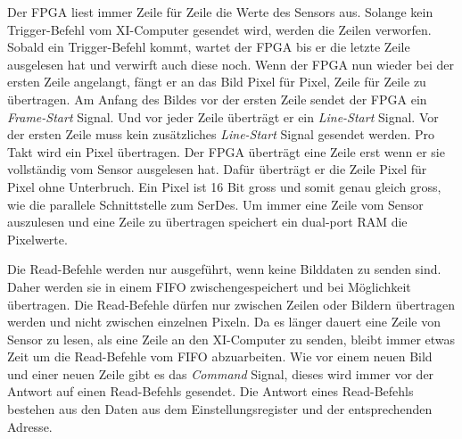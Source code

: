 \documentclass{article}
\begin{document}
Der FPGA liest immer Zeile für Zeile die Werte des Sensors aus. Solange kein Trigger-Befehl vom XI-Computer gesendet wird, werden die Zeilen verworfen. Sobald ein Trigger-Befehl kommt, wartet der FPGA bis er die letzte Zeile ausgelesen hat und verwirft auch diese noch. Wenn der FPGA nun wieder bei der ersten Zeile angelangt, fängt er an das Bild Pixel für Pixel, Zeile für Zeile zu übertragen. Am Anfang des Bildes vor der ersten Zeile sendet der FPGA ein \textit{Frame-Start} Signal. Und vor jeder Zeile überträgt er ein \textit{Line-Start} Signal. Vor der ersten Zeile muss kein zusätzliches \textit{Line-Start} Signal gesendet werden. Pro Takt wird ein Pixel übertragen. Der FPGA überträgt eine Zeile erst wenn er sie vollständig vom Sensor ausgelesen hat. Dafür überträgt er die Zeile Pixel für Pixel ohne Unterbruch. Ein Pixel ist 16 Bit gross und somit genau gleich gross, wie die parallele Schnittstelle zum SerDes. Um immer eine Zeile vom Sensor auszulesen und eine Zeile zu übertragen speichert ein dual-port RAM die Pixelwerte.

Die Read-Befehle werden nur ausgeführt, wenn keine Bilddaten zu senden sind. Daher werden sie in einem FIFO zwischengespeichert und bei Möglichkeit übertragen. Die Read-Befehle dürfen nur zwischen Zeilen oder Bildern übertragen werden und nicht zwischen einzelnen Pixeln. Da es länger dauert eine Zeile von Sensor zu lesen, als eine Zeile an den XI-Computer zu senden, bleibt immer etwas Zeit um die Read-Befehle vom FIFO abzuarbeiten. Wie vor einem neuen Bild und einer neuen Zeile gibt es das \textit{Command} Signal, dieses wird immer vor der Antwort auf einen Read-Befehls gesendet. Die Antwort eines Read-Befehls bestehen aus den Daten aus dem Einstellungsregister und der entsprechenden Adresse.
\end{document}

